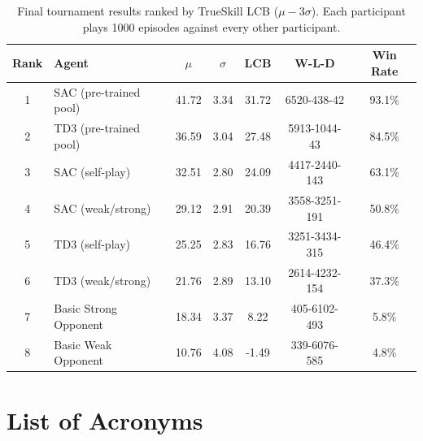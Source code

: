 \documentclass[11pt]{article}
\begin{document}
\begin{table}[htbp]
\centering
\caption{Final tournament results ranked by TrueSkill LCB ($\mu - 3\sigma$).
Each participant plays 1000 episodes against every 
other participant.}
\label{tab:tournament_results}
\begin{tabular}{clccccc}
\toprule
\textbf{Rank} & \textbf{Agent} & $\mu$ & $\sigma$ & \textbf{LCB} & \textbf{W-L-D} & \textbf{Win Rate} \\
\midrule
1 & SAC (pre-trained pool)    & 41.72 & 3.34 & 31.72 & 6520-438-42   & 93.1\% \\
2 & TD3 (pre-trained pool)    & 36.59 & 3.04 & 27.48 & 5913-1044-43  & 84.5\% \\
3 & SAC (self-play)           & 32.51 & 2.80 & 24.09 & 4417-2440-143 & 63.1\% \\
4 & SAC (weak/strong)         & 29.12 & 2.91 & 20.39 & 3558-3251-191 & 50.8\% \\
5 & TD3 (self-play)           & 25.25 & 2.83 & 16.76 & 3251-3434-315 & 46.4\% \\
6 & TD3 (weak/strong)         & 21.76 & 2.89 & 13.10 & 2614-4232-154 & 37.3\% \\
7 & Basic Strong Opponent     & 18.34 & 3.37 &  8.22 & 405-6102-493  &  5.8\% \\
8 & Basic Weak Opponent       & 10.76 & 4.08 & -1.49 & 339-6076-585  &  4.8\% \\
\bottomrule
\end{tabular}
\end{table}







\newpage

\section*{List of Acronyms}
\begin{acronym}


\end{acronym}
\end{document}
